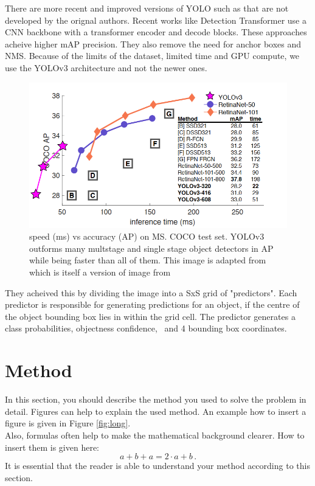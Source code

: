 \documentclass[10pt,twocolumn,letterpaper]{article}
\begin{document}
There are more recent and improved versions of YOLO such as \cite{yolov7} that are not developed by the orignal authors. Recent works like Detection Transformer \cite{DETR} use a CNN backbone with a transformer encoder and decode blocks. These approaches acheive higher mAP precision. They also remove the need for anchor boxes and NMS. Because of the limits of the dataset, limited time and GPU compute, we use the YOLOv3 architecture and not the newer ones.

\begin{figure}[t]
	\begin{center}
		\includegraphics[width=1.0\linewidth]{object_detector_comparisons.png}
	\end{center}
	\caption{speed (ms) vs accuracy (AP) on MS. COCO test set. YOLOv3 outforms many multstage and single stage object detectors in AP while being faster than all of them. This image is adapted from \cite{redmon2018yolov3} which is itself a version of image from \cite{retinaNet}}
	\label{fig:detector_comparison}
\end{figure}


They acheived this by dividing the image into a SxS grid of "predictors". Each predictor is responsible for generating predictions for an object, if the centre of the object bounding box lies in within the grid cell. The predictor generates a class probabilities, objectness confidence, \
and 4 bounding box coordinates. 


\section{Method}
In this section, you should describe the method you used to solve the problem in detail. Figures can help to explain the used method. An example how to insert a figure is given in Figure \ref{fig:long}. \\
Also, formulas often help to make the mathematical background clearer. How to insert them is given here: 
$$a + b + a = 2 \cdot a + b\,.$$
It is essential that the reader is able to understand your method according to this section.
\end{document}
